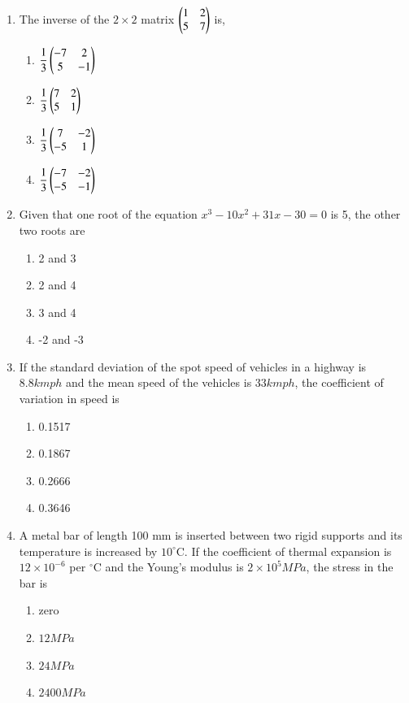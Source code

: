 \documentclass[journal,12pt,onecolumn]{IEEEtran}
\theoremstyle{remark}
\begin{document}
\begin{enumerate}
\item The inverse of the $2 \times 2$ matrix $\begin{pmatrix}1 & 2 \\ 5 & 7\end{pmatrix}$ is,

\hfill{}
\begin{enumerate}
\item $\dfrac{1}{3}\begin{pmatrix}-7 & 2 \\ 5 & -1\end{pmatrix}$
\item $\dfrac{1}{3}\begin{pmatrix}7 & 2 \\ 5 & 1\end{pmatrix}$
\item $\dfrac{1}{3}\begin{pmatrix}7 & -2 \\ -5 & 1\end{pmatrix}$
\item $\dfrac{1}{3}\begin{pmatrix}-7 & -2 \\ -5 & -1\end{pmatrix}$
\end{enumerate}

\item Given that one root of the equation $x^3 - 10x^2 + 31x - 30 = 0$ is 5, the other two roots are

\hfill{}
\begin{enumerate}
\item 2 and 3
\item 2 and 4
\item 3 and 4
\item -2 and -3
\end{enumerate}

\item If the standard deviation of the spot speed of vehicles in a highway is $8.8 kmph$ and the mean speed of the vehicles is $33 kmph$, the coefficient of variation in speed is

\hfill{}
\begin{enumerate}
\item 0.1517
\item 0.1867
\item 0.2666
\item 0.3646
\end{enumerate}

\item A metal bar of length 100 mm is inserted between two rigid supports and its temperature is increased by $10^\circ$C. If the coefficient of thermal expansion is $12 \times 10^{-6}$ per $^\circ$C and the Young’s modulus is $2 \times 10^5 MPa$, the stress in the bar is

\hfill{}
\begin{enumerate}
\item zero
\item $12 MPa$
\item $24 MPa$
\item $2400 MPa$
\end{enumerate}


\end{enumerate}
\end{document}
